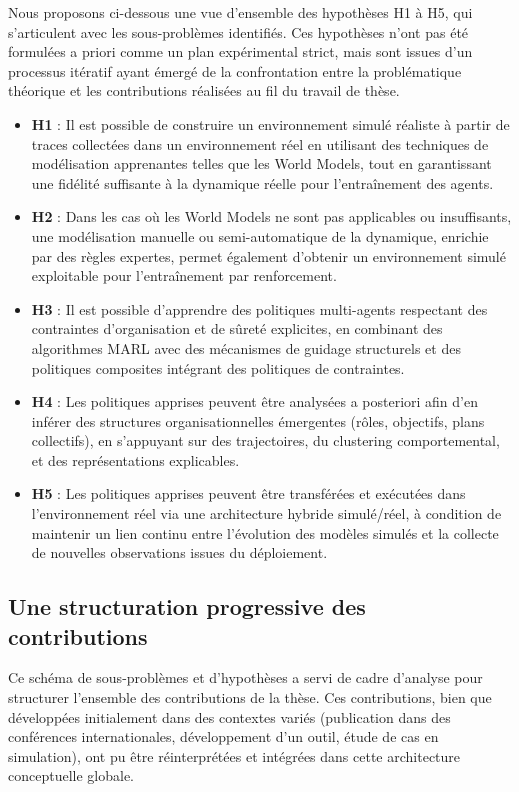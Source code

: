 \documentclass[ twoside,openright,titlepage,numbers=noenddot,headinclude,%
                footinclude=true,cleardoublepage=empty,abstractoff, %
                BCOR=5mm,paper=a4,fontsize=11pt,%
                french,american,%
                ]{scrreprt}
\begin{document}
Nous proposons ci-dessous une vue d'ensemble des hypothèses H1 à H5, qui s'articulent avec les sous-problèmes identifiés. Ces hypothèses n'ont pas été formulées a priori comme un plan expérimental strict, mais sont issues d'un processus itératif ayant émergé de la confrontation entre la problématique théorique et les contributions réalisées au fil du travail de thèse.

\begin{itemize}
    \item \textbf{H1} : Il est possible de construire un environnement simulé réaliste à partir de traces collectées dans un environnement réel en utilisant des techniques de modélisation apprenantes telles que les World Models, tout en garantissant une fidélité suffisante à la dynamique réelle pour l'entraînement des agents.
    \item \textbf{H2} : Dans les cas où les World Models ne sont pas applicables ou insuffisants, une modélisation manuelle ou semi-automatique de la dynamique, enrichie par des règles expertes, permet également d'obtenir un environnement simulé exploitable pour l'entraînement par renforcement.
    \item \textbf{H3} : Il est possible d'apprendre des politiques multi-agents respectant des contraintes d'organisation et de sûreté explicites, en combinant des algorithmes MARL avec des mécanismes de guidage structurels et des politiques composites intégrant des politiques de contraintes.
    \item \textbf{H4} : Les politiques apprises peuvent être analysées a posteriori afin d'en inférer des structures organisationnelles émergentes (rôles, objectifs, plans collectifs), en s'appuyant sur des trajectoires, du clustering comportemental, et des représentations explicables.
    \item \textbf{H5} : Les politiques apprises peuvent être transférées et exécutées dans l'environnement réel via une architecture hybride simulé/réel, à condition de maintenir un lien continu entre l'évolution des modèles simulés et la collecte de nouvelles observations issues du déploiement.
\end{itemize}

\subsection{Une structuration progressive des contributions}

Ce schéma de sous-problèmes et d'hypothèses a servi de cadre d'analyse pour structurer l'ensemble des contributions de la thèse. Ces contributions, bien que développées initialement dans des contextes variés (publication dans des conférences internationales, développement d'un outil, étude de cas en simulation), ont pu être réinterprétées et intégrées dans cette architecture conceptuelle globale.
\end{document}
